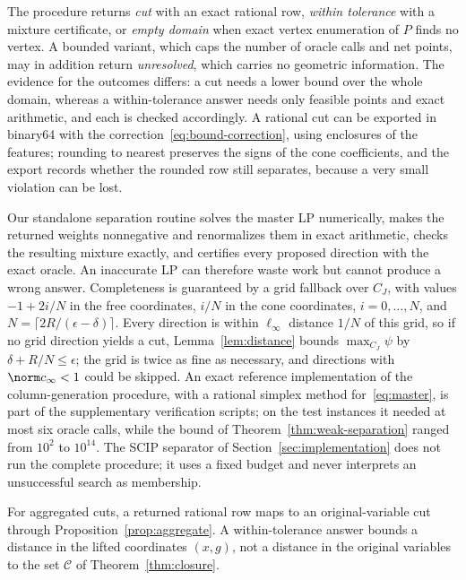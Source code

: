 The procedure returns \emph{cut} with an exact rational row, \emph{within
tolerance} with a mixture certificate, or \emph{empty domain} when exact
vertex enumeration of $P$ finds no vertex. A bounded variant, which caps
the number of oracle calls and net points, may in addition return
\emph{unresolved}, which carries no geometric information. The evidence
for the outcomes differs: a cut needs a lower bound over the whole domain,
whereas a within-tolerance answer needs only feasible points and exact
arithmetic, and each is checked accordingly. A rational cut can be
exported in binary64 with the correction~\eqref{eq:bound-correction},
using enclosures of the features; rounding to nearest preserves the signs
of the cone coefficients, and the export records whether the rounded row
still separates, because a very small violation can be lost.

Our standalone separation routine solves the master LP numerically,
makes the returned weights nonnegative and renormalizes them in exact
arithmetic, checks the resulting mixture exactly, and certifies every
proposed direction with the exact oracle. An inaccurate LP can therefore
waste work but cannot produce a wrong answer. Completeness is guaranteed
by a grid fallback over $C_J$, with values $-1+2i/N$ in the free coordinates,
$i/N$ in the cone coordinates, $i=0,\dots,N$, and
$N=\lceil2R/(\epsilon-\delta)\rceil$. Every direction is within $\ell_\infty$
distance $1/N$ of this grid, so if no grid direction yields a cut,
Lemma~\ref{lem:distance} bounds $\max_{C_J}\psi$ by $\delta+R/N\le\epsilon$; the
grid is twice as fine as necessary, and directions with $\norm c_\infty<1$
could be skipped. An exact
reference implementation of the column-generation procedure, with a
rational simplex method for~\eqref{eq:master}, is part of the
supplementary verification scripts; on the test instances it needed at
most six oracle calls, while the bound of Theorem~\ref{thm:weak-separation}
ranged from $10^2$ to $10^{14}$. The SCIP separator of
Section~\ref{sec:implementation} does not run the complete procedure; it
uses a fixed budget and never interprets an unsuccessful search as
membership.

For aggregated cuts, a returned rational row maps to an original-variable
cut through Proposition~\ref{prop:aggregate}. A within-tolerance answer
bounds a distance in the lifted coordinates $(x,g)$, not a distance in the
original variables to the set $\mathcal C$ of Theorem~\ref{thm:closure}.

